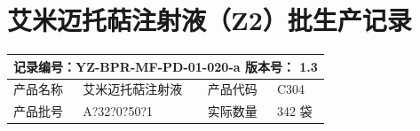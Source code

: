 \documentclass[UTF8,10pt,a4paper,fontset=fandol]{ctexart}
\newcommand{\fieldvalue}[1]{#1}
\newcommand{\handwritten}[1]{#1}
\begin{document}
\newpage

\section*{艾米迈托萜注射液（Z2）批生产记录}

\begin{tabularx}{\textwidth}{|p{2.4cm}|X|p{2.4cm}|X|}
\hline
\multicolumn{4}{|c|}{记录编号：YZ-BPR-MF-PD-01-020-a \hspace{1em} 版本号：%
\fieldvalue{1.3}}\\
\hline
产品名称 & 艾米迈托萜注射液 & 产品代码 & C304\\
\hline
产品批号 &
\fieldvalue{\handwritten{A?32?0?50?1}} &
实际数量 &
\fieldvalue{\handwritten{342}} 袋\\
\hline
\end{tabularx}

\vspace{0.4em}
\end{document}
